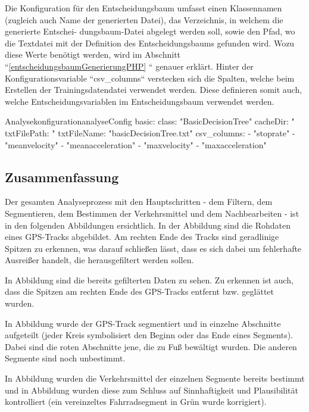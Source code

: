 Die Konfiguration für den Entscheidungsbaum umfasst einen Klassennamen (zugleich auch Name der generierten Datei), das Verzeichnis, in welchem die generierte Entschei- dungsbaum-Datei abgelegt werden soll, sowie den Pfad, wo die Textdatei mit der Definition des Entscheidungsbaums gefunden wird. Wozu diese Werte benötigt werden, wird im Abschnitt ``\ref{entscheidungsbaumGenerierungPHP} `` genauer erklärt. Hinter der Konfigurationsvariable ``csv\_columns`` verstecken sich die Spalten, welche beim Erstellen der Trainingsdatendatei verwendet werden.  Diese definieren somit auch, welche Entscheidungsvariablen im Entscheidungsbaum verwendet werden.

\begin{code}[]{Analysekonfiguration}{analyseConfig}
    basic:
      class: "BasicDecisionTree"
      cacheDir: "%
      txtFilePath: "%
      txtFileName: "basicDecisionTree.txt"
      csv_columns:
        - "stoprate"
        - "meanvelocity"
        - "meanacceleration"
        - "maxvelocity"
        - "maxacceleration"
\end{code}

\subsection{Zusammenfassung}
Der gesamten Analyseprozess mit den Hauptschritten - dem Filtern, dem Segmentieren, dem Bestimmen der Verkehrsmittel und dem Nachbearbeiten - ist in den folgenden Abbildungen ersichtlich. In der Abbildung  sind die Rohdaten eines GPS-Tracks abgebildet. Am rechten Ende des Tracks sind geradlinige Spitzen zu erkennen, was darauf schließen lässt, dass es sich dabei um fehlerhafte Ausreißer handelt, die herausgefiltert werden sollen.


In Abbildung  sind die bereits gefilterten Daten zu sehen. Zu erkennen ist auch, dass die Spitzen am rechten Ende des GPS-Tracks entfernt bzw. geglättet wurden.


 In Abbildung  wurde der GPS-Track segmentiert und in einzelne Abschnitte aufgeteilt (jeder Kreis symbolisiert den Beginn oder das Ende eines Segments). Dabei sind die roten Abschnitte jene, die zu Fuß bewältigt wurden. Die anderen Segmente sind noch unbestimmt.


In Abbildung  wurden die Verkehrsmittel der einzelnen Segmente bereits bestimmt und in Abbildung  wurden diese zum Schluss auf Sinnhaftigkeit und Plausibilität kontrolliert (ein vereinzeltes Fahrradsegment in Grün wurde korrigiert).


